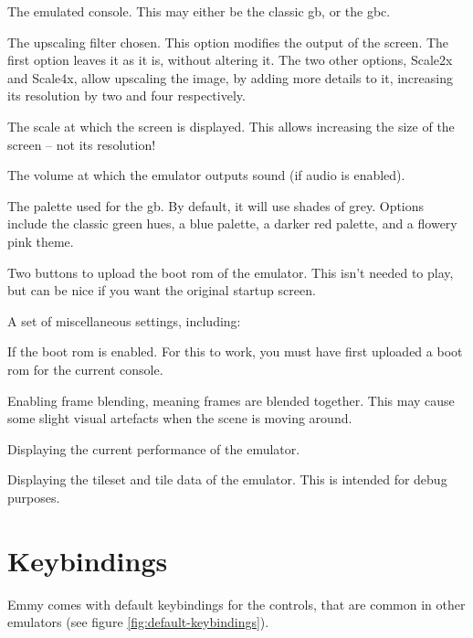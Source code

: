 \begin{compactitem}
	\item The emulated console. This may either be the classic \glsdesc{gb}, or the \glsdesc{gbc}.
	\item The upscaling filter chosen. This option modifies the output of the screen. The first option leaves it as it is, without altering it. The two other options, Scale2x and Scale4x, allow upscaling the image, by adding more details to it, increasing its resolution by two and four respectively.
	\item The scale at which the screen is displayed. This allows increasing the size of the screen -- not its resolution!
	\item The volume at which the emulator outputs sound (if audio is enabled).
	\item The palette used for the \glsdesc{gb}. By default, it will use shades of grey. Options include the classic green hues, a blue palette, a darker red palette, and a flowery pink theme.
	\item Two buttons to upload the boot \gls{rom} of the emulator. This isn't needed to play, but can be nice if you want the original startup screen.
	\item A set of miscellaneous settings, including:
	\begin{compactitem}
		\item If the boot \gls{rom} is enabled. For this to work, you must have first uploaded a boot \gls{rom} for the current console.
		\item Enabling frame blending, meaning frames are blended together. This may cause some slight visual artefacts when the scene is moving around.
		\item Displaying the current performance of the emulator.
		\item Displaying the tileset and tile data of the emulator. This is intended for debug purposes.
	\end{compactitem}
\end{compactitem}

\section{Keybindings}

Emmy comes with default keybindings for the controls, that are common in other emulators (see figure \ref{fig:default-keybindings}). 

